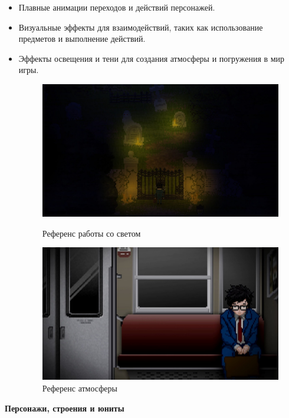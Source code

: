 \documentclass{article}
\begin{document}
	\begin{itemize}
		\item Плавные анимации переходов и действий персонажей.
		\item Визуальные эффекты для взаимодействий, таких как использование предметов и выполнение действий.
		\item Эффекты освещения и тени для создания атмосферы и погружения в мир игры.
		\begin{figure}[h]
			\begin{minipage}{0.4\textwidth}
				\centering
				\includegraphics[width=\textwidth]{images/shadows.jpg}
				\caption{Референс работы со светом}
				\label{fig:effects1}
			\end{minipage} 
			\hfill
			\begin{minipage}{0.4\textwidth}
				\centering
				\includegraphics[width=\textwidth]{images/atmosphere.jpg}
				\caption{Референс атмосферы}
				\label{fig:effects2}
			\end{minipage}
		\end{figure}
	\end{itemize}
	\textbf{Персонажи, строения и юниты}
\end{document}
